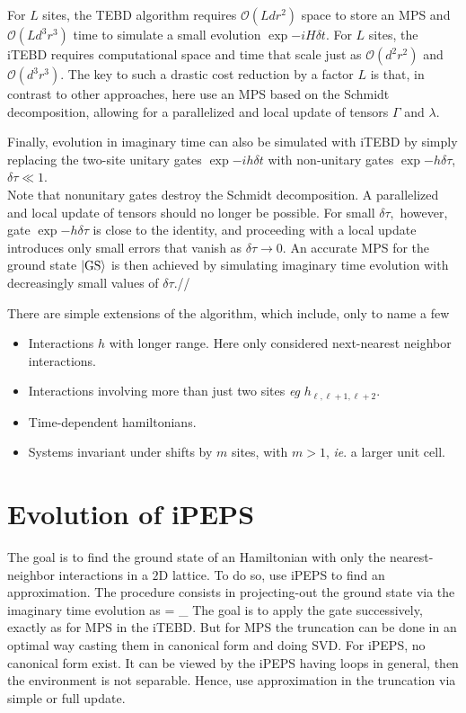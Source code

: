         For $L$ sites, the TEBD algorithm requires $\mathcal{O}(Ldr^2)$ space to store an MPS and $\mathcal{O}(Ld^3r^3)$ time to simulate a small evolution $\exp{-i H\delta t}$. For $L$ sites, the iTEBD requires computational space and time that scale just as $\mathcal{O}(d^2r^2)$ and $\mathcal{O}(d^3r^3)$. The key to such a drastic cost reduction by a factor $L$ is that, in contrast to other approaches, here use an MPS based on the Schmidt decomposition, allowing for a parallelized and local update of tensors $\Gamma$ and $\lambda$.

        Finally, evolution in imaginary time can also be simulated with iTEBD by simply replacing the two-site unitary gates $\exp{-i h\delta t}$ with non-unitary gates $\exp{-h\delta\tau}$, $\delta\tau\ll 1$.\\
        Note that nonunitary gates destroy the Schmidt decomposition. A parallelized and local update of tensors should no longer be possible. For small $\delta\tau,$ however, gate $\exp{-h\delta\tau}$ is close to the identity, and proceeding with a local update introduces only small errors that vanish as $\delta\tau\longrightarrow 0$. An accurate MPS for the ground state $\ket{\text{GS}}$ is then achieved by simulating imaginary time evolution with decreasingly small values of $\delta\tau$.//

        There are simple extensions of the algorithm, which include, only to name a few
        \begin{itemize}
            \item Interactions $h$ with longer range. Here only considered next-nearest neighbor interactions.
            \item Interactions involving more than just two sites \emph{eg} $h_{\ell,\ell+1,\ell+2}$.
            \item Time-dependent hamiltonians.
            \item Systems invariant under shifts by $m$ sites, with $m>1$, \emph{ie}. a larger unit cell.
        \end{itemize}

    \section{Evolution of iPEPS}

        The goal is to find the ground state of an Hamiltonian with only the nearest-neighbor interactions in a $2$D lattice. To do so, use iPEPS to find an approximation. The procedure consists in projecting-out the ground state via the imaginary time evolution as
        \be {} = \lim_{\tau\to\infty}  \ee
        The goal is to apply the gate successively, exactly as for MPS in the iTEBD. But for MPS the truncation can be done in an optimal way casting them in canonical form and doing SVD. For iPEPS, no canonical form exist. It can be viewed by the iPEPS having loops in general, then the environment is not separable. Hence, use approximation in the truncation via simple or full update.

